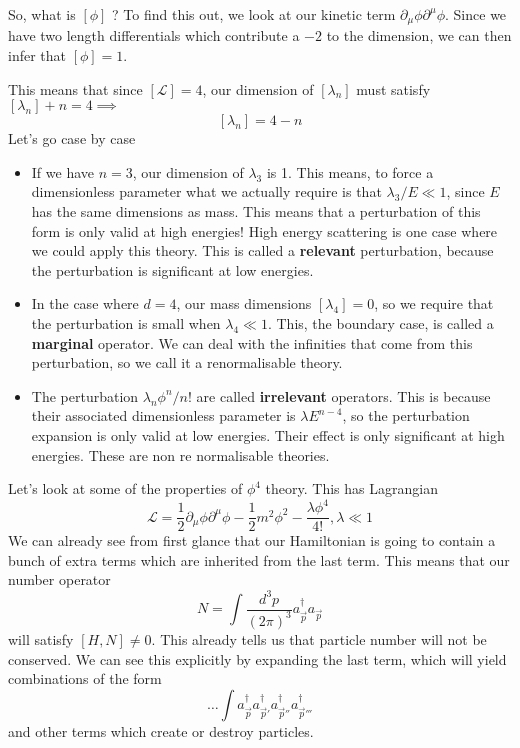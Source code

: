 So, what is $ [ \phi ] $ ? To find this out, 
we look at our kinetic term $ \partial _\mu \phi \partial  ^\mu \phi$. 
Since we have two length differentials which contribute a $ - 2$ to the dimension, we 
can then infer that $ [ \phi ] = 1 $. 

This means that since $ [ \mathcal{ L } ]  = 4$, our dimension of $ [ \lambda_ n ] $
must satisfy  $ [ \lambda_n ] + n = 4 \implies $
\[
[ \lambda _ n ] = 4 - n
\] Let's go case by case 
\begin{itemize}
\item  If we have $ n = 3$, our dimension of  $ \lambda_3  $ is 1. 
This means, to force a dimensionless parameter what we actually require is that 
$ \lambda_3 / E  \ll 1 $, since $ E $ has the same dimensions as mass. 
This means that a perturbation of this form is only valid at high energies! 
High energy scattering is one case where we could apply this theory. This is 
called a \textbf{relevant} perturbation, 
because the perturbation is significant at low energies.
\item In the case where $ d = 4$, our mass dimensions $ [ \lambda_4 ]  =0 $, so we 
require that the perturbation is small when $ \lambda_4 \ll 1 $. 
This, the boundary case, is called a \textbf{marginal} operator.
We can deal with the infinities that come from this perturbation, 
so we call it a renormalisable theory. 
\item The perturbation $ \lambda_{ n } \phi^ n / n! $ are called \textbf{irrelevant} 
operators. This is because their associated dimensionless parameter is 
$ \lambda E^{ n - 4}$, so the perturbation expansion is only valid at low energies. 
Their effect is only significant at high energies. These are non re normalisable theories.   
\end{itemize}
Let's look at some of the properties of $ \phi^ 4 $ theory. 
This has Lagrangian 
\[
\mathcal{ L } = \frac{1}{2 } \partial _\mu \phi \partial  ^\mu \phi - \frac{1}{2 } m ^2 \phi ^ 2 - \frac{ \lambda \phi^ 4 }{4 !}, \lambda \ll 1 
\] We can already see from first glance that our Hamiltonian is going to contain 
a bunch of extra terms which are inherited from the last term. 
This means that our number operator 
\[
N = \int \frac{ d^ 3 p }{ ( 2 \pi ) ^ 3 } a_{ \vec{p} }^ \dagger a_{ \vec{p}}
\]  will satisfy $ [ H , N ] \neq 0 $. 
This already tells us that particle number will not be conserved. 
We can see this explicitly by expanding the last term, which will yield combinations
of the form 
\[
\dots \int a^\dagger_{ \vec{p}} a^\dagger_{\vec{p}'} a^\dagger_{\vec{p}''}a^\dagger_{ \vec{p}'''}
\] and other terms which create or destroy particles. 

